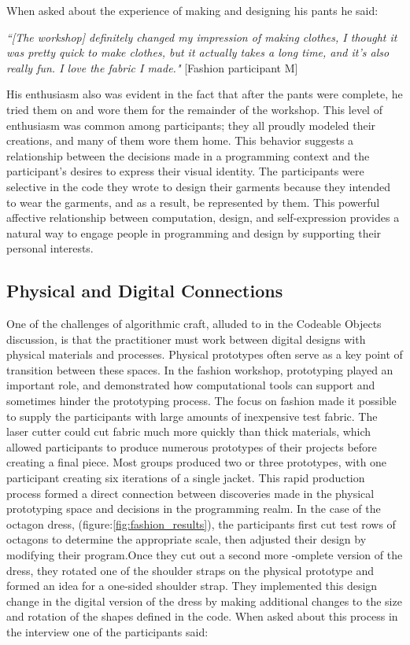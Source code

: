 When asked about the experience of making and designing his pants he said:

\textit{``[The workshop] definitely changed my impression of making clothes, I thought it was pretty quick to make clothes, but it actually takes a long time, and it's also really fun. I love the fabric I made."} [Fashion participant M]

His enthusiasm also was evident in the fact that after the pants were complete, he tried them on and wore them for the remainder of the workshop. This level of enthusiasm was common among participants; they all proudly modeled their creations, and many of them wore them home. This behavior suggests a relationship between the decisions made in a programming context and the participant's desires to express their visual identity. The participants were selective in the code they wrote to design their garments because they intended to wear the garments, and as a result, be represented by them. This powerful affective relationship between computation, design, and self-expression provides a natural way to engage people in programming and design by supporting their personal interests. 

\subsection{Physical and Digital Connections}

One of the challenges of algorithmic craft, alluded to in the Codeable Objects discussion, is that the practitioner must work between digital designs with physical materials and processes. Physical prototypes often serve as a key point of transition between these spaces. In the fashion workshop, prototyping played an important role, and demonstrated how computational tools can support and sometimes hinder the prototyping process. The focus on fashion made it possible to supply the participants with large amounts of inexpensive test fabric. The laser cutter could cut fabric much more quickly than thick materials, which allowed participants to produce numerous prototypes of their projects before creating a final piece. Most groups produced two or three prototypes, with one participant creating six iterations of a single jacket. This rapid production process formed a direct connection between discoveries made in the physical prototyping space and decisions in the programming realm. 
In the case of the octagon dress, (figure:\ref{fig:fashion_results}), the participants first cut test rows of octagons to determine the appropriate scale, then adjusted their design by modifying their program.Once they cut out a second more -omplete version of the dress, they rotated one of the shoulder straps on the physical prototype and formed an idea for a one-sided shoulder strap. They implemented this design change in the digital version of the dress by making additional changes to the size and rotation of the shapes defined in the code. When asked about this process in the interview one of the participants said:

